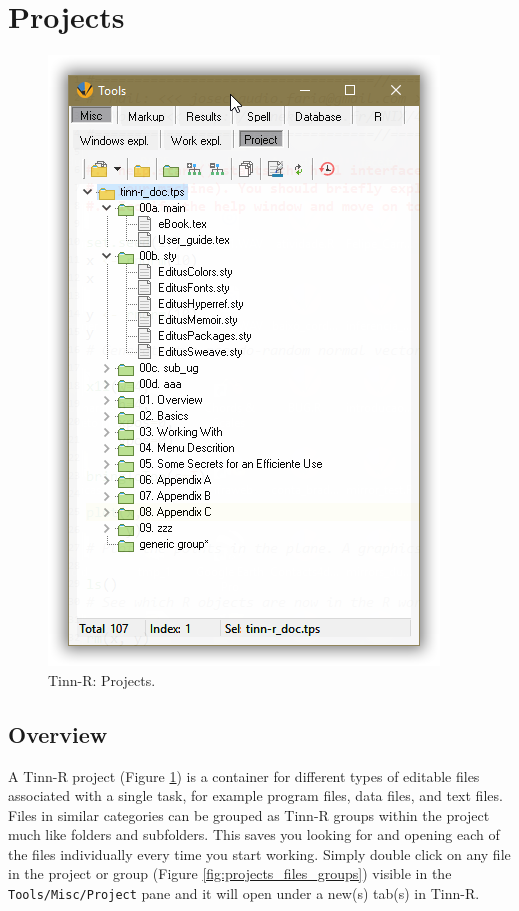 
\hypertarget{working_projects}{}
\section{Projects}

\begin{figure}[H]
  \begin{center}
    \includegraphics[scale=0.60]{./res/tools_misc_project.png}
  \end{center}
  \caption{Tinn-R: Projects.}
  \label{fig:tinn-r_projects}
\end{figure}

\subsection{Overview}
A Tinn-R project (Figure \ref{fig:tinn-r_projects}) is a container for different types of editable 
files associated with a single task, for example program files, data files, and text files. 
Files in similar categories can be grouped as Tinn-R groups within the project much like folders and subfolders.  
This saves you looking for and opening each of the files individually every time you start working. 
Simply double click on any file in the project or group
(Figure \ref{fig:projects_files_groups})
visible in the \texttt{Tools/Misc/Project} pane
and it will open under a new(s) tab(s) in Tinn-R.


